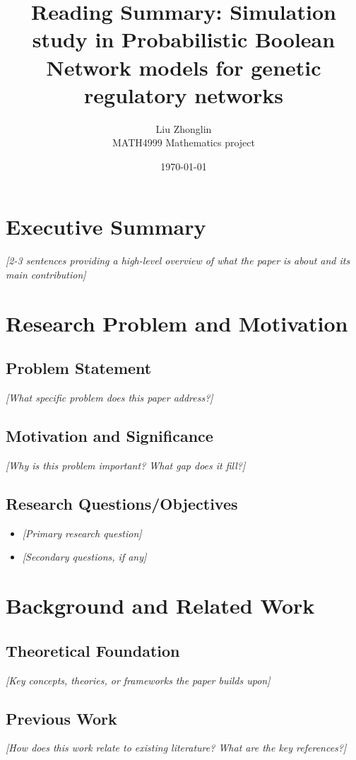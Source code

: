 \documentclass[11pt]{article}
\title{Reading Summary: Simulation study in Probabilistic Boolean Network models for genetic regulatory networks}
\author{Liu Zhonglin \\ MATH4999 Mathematics project}
\date{\today}
\begin{document}
	
	\maketitle
	\thispagestyle{empty}
	
	
	
	\section{Executive Summary}
	\textit{[2-3 sentences providing a high-level overview of what the paper is about and its main contribution]}
	
	\section{Research Problem and Motivation}
	\subsection{Problem Statement}
	\textit{[What specific problem does this paper address?]}
	
	\subsection{Motivation and Significance}
	\textit{[Why is this problem important? What gap does it fill?]}
	
	\subsection{Research Questions/Objectives}
	\begin{itemize}
		\item \textit{[Primary research question]}
		\item \textit{[Secondary questions, if any]}
	\end{itemize}
	
	\section{Background and Related Work}
	\subsection{Theoretical Foundation}
	\textit{[Key concepts, theories, or frameworks the paper builds upon]}
	
	\subsection{Previous Work}
	\textit{[How does this work relate to existing literature? What are the key references?]}
	
\end{document}
